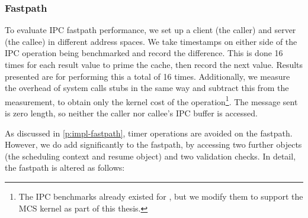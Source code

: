 \subsubsection{Fastpath}

To evaluate IPC fastpath performance, we set up a client (the caller) and server (the callee) in different
address spaces. We take timestamps on either side of the IPC operation being benchmarked and record
the difference. This is done 16 times for each result value to prime the cache, then record the next
value. Results presented are for performing this a total of 16 times. Additionally, we measure the
overhead of system calls stubs in the same way and subtract this from the measurement, to obtain
only the kernel cost of the operation\footnote{The \gls{IPC} benchmarks already existed for
 \selfour, but we modify them to support the \gls{MCS} kernel as part of this thesis.}.
   The message sent is zero length, so neither the caller nor callee's \gls{IPC} buffer is accessed.

As discussed in \cref{p:impl-fastpath}, timer operations are avoided on the fastpath. However, we do
add significantly to the \call fastpath, by accessing two further objects (the scheduling context
and resume object) and two validation checks. In detail, the \call fastpath is altered as follows:

